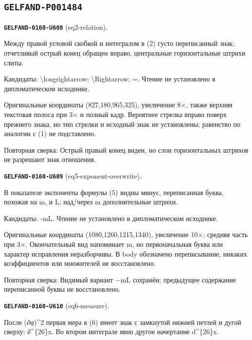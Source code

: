 \subsection*{\texttt{GELFAND-P001484}}
\par\noindent\leavevmode{}\label{GELFAND-0160-U608}\label{GELFAND-P001484:eq2-relation}\textbf{\texttt{GELFAND-0160-U608}} (eq2-relation).\nopagebreak[4]\par
Между правой угловой скобкой и интегралом в (2) густо переписанный знак; отчетливый острый конец обращен вправо, центральные горизонтальные штрихи слиты.\par
Кандидаты: \textbackslash{}longrightarrow; \textbackslash{}Rightarrow; =. Чтение не установлено в дипломатическом исходнике.\par
Оригинальные координаты (827,180,965,325), увеличение 8×, также верхняя текстовая полоса при 3× и полный кадр. Вероятнее стрелка вправо поверх прежнего знака, но тип стрелки и исходный знак не установлены; равенство по аналогии с (1) не подставлено.\par
Повторная сверка: Острый правый конец виден, но слои горизонтальных штрихов не разрешают знак отношения.\par\medskip
\par\noindent\leavevmode{}\label{GELFAND-0160-U609}\label{GELFAND-P001484:eq5-exponent-overwrite}\textbf{\texttt{GELFAND-0160-U609}} (eq5-exponent-overwrite).\nopagebreak[4]\par
В показателе экспоненты формулы (5) видны минус, переписанная буква, похожая на m, и L; над/через m дополнительные штрихи.\par
Кандидаты: -mL. Чтение не установлено в дипломатическом исходнике.\par
Оригинальные координаты (1080,1260,1215,1340), увеличение 10×; средняя часть при 3×. Окончательный вид напоминает m, но первоначальная буква или характер исправления неразборчивы. В body обозначено переписывание, никаких коэффициентов или множителей не восстановлено.\par
Повторная сверка: Видимый вариант −mL сохранён; предыдущее содержание переписанной буквы не восстановлено.\par\medskip
\par\noindent\leavevmode{}\label{GELFAND-0160-U610}\label{GELFAND-P001484:eq6-measure}\textbf{\texttt{GELFAND-0160-U610}} (eq6-measure).\nopagebreak[4]\par
После (∂φ)\textasciicircum{}2 первая мера в (6) имеет знак с замкнутой нижней петлей и дугой сверху: ∂\textasciicircum{}\{26\}x. Во втором интеграле явно другое начертание d\textasciicircum{}\{26\}x.\par
